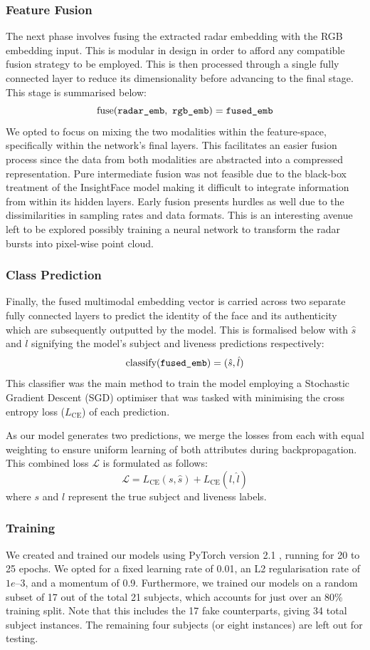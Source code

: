 \documentclass{mpaper}
\begin{document}
\subsubsection{Feature Fusion}
The next phase involves fusing the extracted radar embedding with the RGB embedding input. This is modular in design in order to afford any compatible fusion strategy to be employed. This is then processed through a single fully connected layer to reduce its dimensionality before advancing to the final stage. This stage is summarised below:
$$\text{fuse}(\verb|radar_emb|, \ \verb|rgb_emb|) = \verb|fused_emb|$$
We opted to focus on mixing the two modalities within the feature-space, specifically within the network's final layers. This facilitates an easier fusion process since the data from both modalities are abstracted into a compressed representation. Pure intermediate fusion was not feasible due to the black-box treatment of the InsightFace model making it difficult to integrate information from within its hidden layers. Early fusion presents hurdles as well due to the dissimilarities in sampling rates and data formats. This is an interesting avenue left to be explored possibly training a neural network to transform the radar bursts into pixel-wise point cloud.

\subsubsection{Class Prediction}
Finally, the fused multimodal embedding vector is carried across two separate fully connected layers to predict the identity of the face and its authenticity which are subsequently outputted by the model. This is formalised below with $\hat{s}$ and $\hat{l}$ signifying the model's subject and liveness predictions respectively: 
$$\text{classify}(\verb|fused_emb|) = (\hat{s}, \hat{l})$$
This classifier was the main method to train the model employing a Stochastic Gradient Descent (SGD) optimiser that was tasked with minimising the cross entropy loss ($L_{\text{CE}}$) of each prediction. 

As our model generates two predictions, we merge the losses from each with equal weighting to ensure uniform learning of both attributes during backpropagation. This combined loss $\mathcal{L}$ is formulated as follows:
$$\mathcal{L} = L_{\text{CE}}(s, \hat{s}) + L_{\text{CE}}(l, \hat{l})$$
where $s$ and $l$ represent the true subject and liveness labels.

\vspace{0.2cm}
\subsubsection{Training}
We created and trained our models using PyTorch version 2.1 \cite{paszke2019pytorch}, running for 20 to 25 epochs. We opted for a fixed learning rate of 0.01, an L2 regularisation rate of $1e\text{--3}$, and a momentum of 0.9. Furthermore, we trained our models on a random subset of 17 out of the total 21 subjects, which accounts for just over an 80\% training split. Note that this includes the 17 fake counterparts, giving 34 total subject instances. The remaining four subjects (or eight instances) are left out for testing. 
\end{document}
